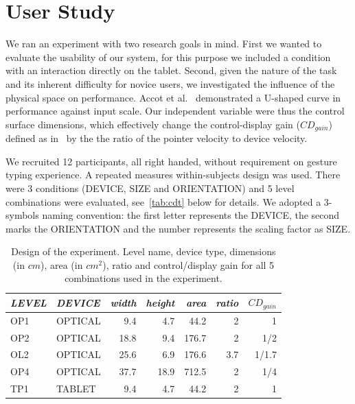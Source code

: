 \documentclass{chi-ext}
\newcommand{\smit}[1]{{\small\textit{{#1}}}}
\newcommand{\cdt}[1]{{\small\uppercase{{#1}}}}
\begin{document}
\section{User Study}
We ran an experiment with two research goals in mind. First we wanted to evaluate the usability of our system, for this purpose we included a condition with an interaction directly on the tablet. Second, given the nature of the task and its inherent difficulty for novice users, we investigated the influence of the physical space on performance. Accot et al.~\cite{Accot2001} demonstrated a U-shaped curve in performance against input scale. Our independent variable were thus the control surface dimensions, which effectively change the control-display gain ($CD_{gain}$) defined as in~\cite{Casiez2008} by the the ratio of the pointer velocity to device velocity.

We recruited 12 participants, all right handed, without requirement on gesture typing experience.
A repeated measures within-subjects design was used. There were 3 conditions (\cdt{device}, \cdt{size} and \cdt{orientation}) and 5 level combinations were evaluated, see~\autoref{tab:cdt} below for details. We adopted a 3-symbols naming convention: the first letter represents the DEVICE, the second marks the ORIENTATION and the number represents the scaling factor as SIZE.

\begin{table}
  \centering
  \begin{tabular}{l l | r r r r r}
    \smit{LEVEL} & \smit{DEVICE} & \smit{width} & \smit{height} & \smit{area}& \smit{ratio} & \smit{$CD_{gain}$} \\
    \hline
    \cdt{OP1} & \cdt{optical} & 9.4 & 4.7 & 44.2 & 2 & 1 \\
    \cdt{OP2} & \cdt{optical} & 18.8 & 9.4 & 176.7 & 2 & 1/2 \\
    \cdt{OL2} & \cdt{optical} & 25.6 & 6.9 & 176.6 & 3.7 & 1/1.7 \\
    \cdt{OP4} & \cdt{optical} & 37.7 & 18.9 & 712.5 & 2 & 1/4 \\
    \hline
    \cdt{tp1} & \cdt{tablet} & 9.4 & 4.7 & 44.2 & 2 & 1 \\
  \end{tabular}
  \caption{Design of the experiment. Level name, device type, dimensions (in $cm$), area (in $cm^2$), ratio and control/display gain for all 5 combinations used in the experiment.}~\label{tab:cdt}
\end{table}
\end{document}
